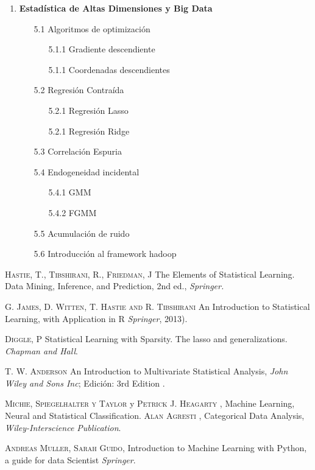 \documentclass[11pt]{report}
\begin{document}
\begin{enumerate}
\item \textbf{Estadística de Altas Dimensiones y  Big Data}
\begin{itemize}
\item[5.1] Algoritmos de optimización
\begin{itemize}
\item[5.1.1] Gradiente descendiente
\item[5.1.1] Coordenadas descendientes
\end{itemize}
\item[5.2] Regresión Contraída
\begin{itemize}
\item[5.2.1] Regresión Lasso
\item[5.2.1] Regresión Ridge
\end{itemize}
\item[5.3] Correlación Espuria 
\item[5.4] Endogeneidad incidental
\begin{itemize}
\item[5.4.1] GMM
\item[5.4.2] FGMM 
 \end{itemize}
 \item[5.5] Acumulación de ruido
 \item[5.6]  Introducción al framework hadoop
 

\end{itemize}

\end{enumerate}


\begin{thebibliography}{X}

 \textsc{Hastie, T., Tibshirani, R., Friedman, J} The Elements of Statistical Learning. Data Mining, Inference, and Prediction, 2nd ed., \textit{Springer.}

  \textsc{G. James, D. Witten, T. Hastie and R. Tibshirani}  An Introduction to Statistical Learning, with Application in R  \textit{Springer}, 2013).

 \textsc{Diggle, P} 
Statistical Learning with Sparsity. The lasso and generalizations. \textit{Chapman and Hall}.


 \textsc{T. W. Anderson} An Introduction to Multivariate Statistical Analysis, \textit{John Wiley and Sons Inc}; Edición: 3rd Edition .

 \textsc{Michie, Spiegelhalter y Taylor} y \textsc{Petrick J. Heagarty }, Machine Learning, Neural and Statistical Classification.
 \textsc{Alan Agresti } ,
Categorical Data Analysis,
\textit{ Wiley-Interscience Publication}.

 \textsc{Andreas Muller, Sarah Guido},
Introduction to Machine Learning with Python, a guide for data Scientist
\textit{Springer}. 

\end{thebibliography}
\end{document}
